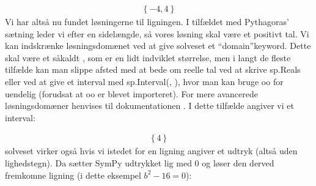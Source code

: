 \documentclass[letterpaper,10pt,english]{jupyterBook}
\begin{document}
\begin{sphinxVerbatim}[commandchars=\\\{\}]
   
\end{sphinxVerbatim}
\begin{equation*}
\begin{split}\displaystyle \left\{-4, 4\right\}\end{split}
\end{equation*}
Vi har altså nu fundet løsningerne til ligningen. I tilfældet med Pythagoras’ sætning leder vi efter en sidelængde, så vores løsning skal være et positivt tal. Vi kan indskrænke løsningsdomænet ved at give solveset et “domain”\sphinxhyphen{}keyword. Dette skal være et såkaldt , som er en lidt indviklet størrelse, men i langt de fleste tilfælde kan man slippe afsted med at bede om reelle tal ved at skrive sp.Reals eller ved at give et interval med sp.Interval(, ), hvor man kan bruge oo for uendelig (forudsat at oo er blevet importeret). For mere avancerede løsningsdomæner henvises til dokumentationen . I dette tilfælde angiver vi et interval:

\begin{sphinxVerbatim}[commandchars=\\\{\}]
              
     
\end{sphinxVerbatim}
\begin{equation*}
\begin{split}\displaystyle \left\{4\right\}\end{split}
\end{equation*}
solveset virker også hvis vi istedet for en ligning angiver et udtryk (altså uden lighedstegn). Da sætter SymPy udtrykket lig med 0 og løser den derved fremkomne ligning (i dette eksempel \(b^2-16 = 0\)):
\end{document}
